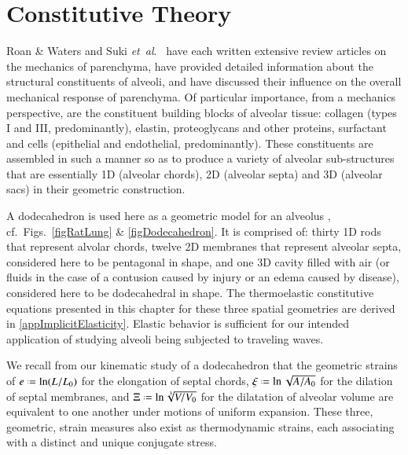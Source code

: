 \part{Constitutive Theory}
\label{partConstitutive}

Roan \& Waters \cite{RoanWaters11} and Suki \textit{et~al}.\ \cite{Sukietal05,Sukietal11} have each written extensive review articles on the mechanics of parenchyma, have provided detailed information about the structural constituents of alveoli, and have discussed their influence on the overall mechanical response of parenchyma.  Of particular importance, from a mechanics perspective, are the constituent building blocks of alveolar tissue: collagen (types I and III, predominantly), elastin, proteoglycans and other proteins, surfactant and cells (epithelial and endothelial, predominantly).  These constituents are assembled in such a manner so as to produce a variety of alveolar sub-structures that are essentially 1D (alveolar chords), 2D (alveolar septa) and 3D (alveolar sacs) in their geometric construction.

A dodecahedron is used here as a geometric model for an alveolus \cite{FrankusLee74}, cf.\ Figs.~\ref{figRatLung} \& \ref{figDodecahedron}.  It is comprised of: thirty 1D rods that represent alvolar chords, twelve 2D membranes that represent alveolar septa, considered here to be pentagonal in shape, and one 3D cavity filled with air (or fluids in the case of a contusion caused by injury or an edema caused by disease), considered here to be dodecahedral in shape.  The thermo\-elastic constitutive equations presented in this chapter for these three spatial geometries are derived in \ref{appImplicitElasticity}.  Elastic behavior is sufficient for our intended application of studying alveoli being subjected to traveling waves.

We recall from our kinematic study of a dodecahedron that the geometric strains of $e \defeq \ln ( L / L_0 )$ for the elongation of septal chords, $\xi \defeq \ln \sqrt{A / A_0}$ for the dilation of septal membranes, and $\Xi \defeq \ln \sqrt[3]{V / V_0}$ for the dilatation of alveolar volume are equivalent to one another under motions of uniform expansion.  These three, geometric, strain measures also exist as thermo\-dynamic strains, each associating with a distinct and unique conjugate stress.

